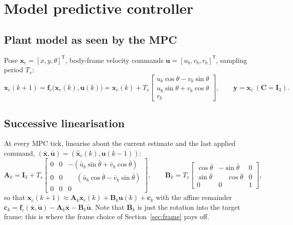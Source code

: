 \documentclass[11pt,a4paper]{article}
\newcommand{\vect}[1]{\bm{#1}}
\newcommand{\mat}[1]{\bm{#1}}
\newcommand{\T}{^{\mathsf{T}}}
\newcommand{\hx}{\hat{\vect{x}}}
\newcommand{\Ts}{T_s}
\begin{document}
\section{Model predictive controller}
\label{sec:mpc}

\subsection{Plant model as seen by the MPC}
Pose $\vect x_c=[x,y,\theta]\T$, body-frame velocity commands $\vect u=[u_b,v_b,r_b]\T$, sampling period $\Ts$:
\begin{equation}
\vect x_c(k+1) = \vect f_c\big(\vect x_c(k),\vect u(k)\big) = \vect x_c(k) + \Ts
\begin{bmatrix}
u_b\cos\theta - v_b\sin\theta \\
u_b\sin\theta + v_b\cos\theta \\
r_b
\end{bmatrix},
\qquad
\vect y = \vect x_c \ (\mat C=\mat I_3).
\label{eq:fc}
\end{equation}

\subsection{Successive linearisation}
At every MPC tick, linearise about the current estimate and the last applied command, $(\bar{\vect x},\bar{\vect u}) = (\hx_c(k),\vect u(k-1))$:
\begin{equation}
\mat A_k = \mat I_3 + \Ts
\begin{bmatrix}
0 & 0 & -(\bar u_b\sin\bar\theta + \bar v_b\cos\bar\theta) \\
0 & 0 & \phantom{-}(\bar u_b\cos\bar\theta - \bar v_b\sin\bar\theta) \\
0 & 0 & 0
\end{bmatrix},
\qquad
\mat B_k = \Ts
\begin{bmatrix}
\cos\bar\theta & -\sin\bar\theta & 0 \\
\sin\bar\theta & \phantom{-}\cos\bar\theta & 0 \\
0 & 0 & 1
\end{bmatrix},
\label{eq:AB}
\end{equation}
so that $\vect x_c(k+1)\approx \mat A_k\vect x_c(k)+\mat B_k\vect u(k)+\vect c_k$ with the affine remainder $\vect c_k = \vect f_c(\bar{\vect x},\bar{\vect u})-\mat A_k\bar{\vect x}-\mat B_k\bar{\vect u}$. Note that $\mat B_k$ is just the rotation into the target frame: this is where the frame choice of Section~\ref{sec:frame} pays off.
\end{document}
